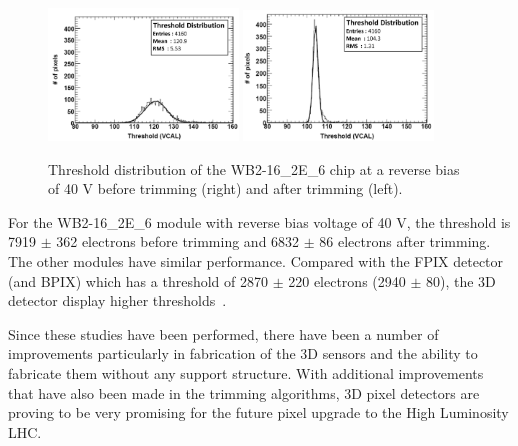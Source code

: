 \begin{figure}[htb!]
\begin{center}
\centerline{
\includegraphics[width=0.45\textwidth]{3D/threshold1.pdf}
\includegraphics[width=0.45\textwidth]{3D/threshold2.pdf}
}
\caption{Threshold distribution of the WB2-16\_2E\_6 chip at a reverse bias of
40 V before trimming (right) and after trimming (left).~\cite{5734879} }
\label{fig:threshold}
\end{center}
\end{figure}

For the WB2-16\_2E\_6 module with reverse bias voltage of 40 V, the threshold is 7919 $\pm$ 362 electrons before trimming and 6832 $\pm$ 86 electrons after trimming. The other modules have similar performance. Compared with the FPIX detector (and BPIX) which has a threshold of 2870 $\pm$ 220 electrons (2940 $\pm$ 80), the 3D detector display higher thresholds~\cite{CMSpixel}.

Since these studies have been performed, there have been a number of improvements particularly in fabrication of the 3D sensors and the ability to fabricate them without any support structure.  With additional improvements that have also been made in the trimming algorithms, 3D pixel detectors are proving to be very promising for the future pixel upgrade to the High Luminosity LHC.  
